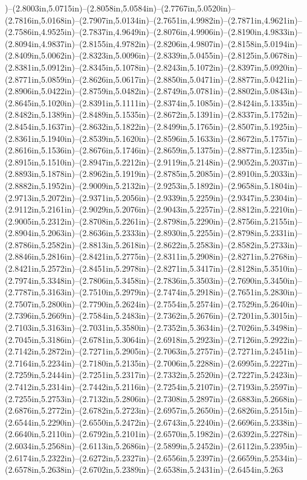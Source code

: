 )--(2.8003in,5.0715in)--(2.8058in,5.0584in)--(2.7767in,5.0520in)--(2.7816in,5.0168in)--(2.7907in,5.0134in)--(2.7651in,4.9982in)--(2.7871in,4.9621in)--(2.7586in,4.9525in)--(2.7837in,4.9649in)--(2.8076in,4.9906in)--(2.8190in,4.9833in)--(2.8094in,4.9837in)--(2.8155in,4.9782in)--(2.8206in,4.9807in)--(2.8158in,5.0194in)--(2.8409in,5.0062in)--(2.8323in,5.0096in)--(2.8339in,5.0455in)--(2.8125in,5.0678in)--(2.8381in,5.0912in)--(2.8345in,5.1078in)--(2.8243in,5.1072in)--(2.8397in,5.0920in)--(2.8771in,5.0859in)--(2.8626in,5.0617in)--(2.8850in,5.0471in)--(2.8877in,5.0421in)--(2.8906in,5.0422in)--(2.8759in,5.0482in)--(2.8749in,5.0781in)--(2.8802in,5.0843in)--(2.8645in,5.1020in)--(2.8391in,5.1111in)--(2.8374in,5.1085in)--(2.8424in,5.1335in)--(2.8482in,5.1389in)--(2.8489in,5.1535in)--(2.8672in,5.1391in)--(2.8337in,5.1752in)--(2.8454in,5.1637in)--(2.8632in,5.1822in)--(2.8499in,5.1765in)--(2.8507in,5.1925in)--(2.8361in,5.1940in)--(2.8539in,5.1620in)--(2.8596in,5.1633in)--(2.8672in,5.1757in)--(2.8616in,5.1536in)--(2.8676in,5.1746in)--(2.8659in,5.1375in)--(2.8877in,5.1235in)--(2.8915in,5.1510in)--(2.8947in,5.2212in)--(2.9119in,5.2148in)--(2.9052in,5.2037in)--(2.8893in,5.1878in)--(2.8962in,5.1919in)--(2.8785in,5.2085in)--(2.8910in,5.2033in)--(2.8882in,5.1952in)--(2.9009in,5.2132in)--(2.9253in,5.1892in)--(2.9658in,5.1804in)--(2.9713in,5.2072in)--(2.9371in,5.2056in)--(2.9339in,5.2259in)--(2.9347in,5.2304in)--(2.9112in,5.2161in)--(2.9029in,5.2076in)--(2.9043in,5.2257in)--(2.8812in,5.2210in)--(2.9005in,5.2312in)--(2.8708in,5.2261in)--(2.8798in,5.2290in)--(2.8756in,5.2155in)--(2.8904in,5.2063in)--(2.8636in,5.2333in)--(2.8930in,5.2255in)--(2.8798in,5.2331in)--(2.8786in,5.2582in)--(2.8813in,5.2618in)--(2.8622in,5.2583in)--(2.8582in,5.2733in)--(2.8846in,5.2816in)--(2.8421in,5.2775in)--(2.8311in,5.2908in)--(2.8271in,5.2768in)--(2.8421in,5.2572in)--(2.8451in,5.2978in)--(2.8271in,5.3417in)--(2.8128in,5.3510in)--(2.7974in,5.3348in)--(2.7806in,5.3458in)--(2.7836in,5.3503in)--(2.7690in,5.3450in)--(2.7787in,5.3163in)--(2.7510in,5.2979in)--(2.7474in,5.2918in)--(2.7651in,5.2830in)--(2.7507in,5.2800in)--(2.7790in,5.2624in)--(2.7554in,5.2574in)--(2.7529in,5.2640in)--(2.7396in,5.2669in)--(2.7584in,5.2483in)--(2.7362in,5.2676in)--(2.7201in,5.3015in)--(2.7103in,5.3163in)--(2.7031in,5.3580in)--(2.7352in,5.3634in)--(2.7026in,5.3498in)--(2.7045in,5.3186in)--(2.6781in,5.3064in)--(2.6918in,5.2923in)--(2.7126in,5.2922in)--(2.7142in,5.2872in)--(2.7271in,5.2905in)--(2.7063in,5.2757in)--(2.7271in,5.2451in)--(2.7164in,5.2234in)--(2.7180in,5.2135in)--(2.7006in,5.2288in)--(2.6995in,5.2227in)--(2.7259in,5.2444in)--(2.7251in,5.2317in)--(2.7332in,5.2520in)--(2.7227in,5.2423in)--(2.7412in,5.2314in)--(2.7442in,5.2116in)--(2.7254in,5.2107in)--(2.7193in,5.2597in)--(2.7255in,5.2753in)--(2.7132in,5.2806in)--(2.7308in,5.2897in)--(2.6883in,5.2668in)--(2.6876in,5.2772in)--(2.6782in,5.2723in)--(2.6957in,5.2650in)--(2.6826in,5.2515in)--(2.6544in,5.2290in)--(2.6550in,5.2472in)--(2.6743in,5.2240in)--(2.6696in,5.2338in)--(2.6640in,5.2110in)--(2.6792in,5.2101in)--(2.6570in,5.1982in)--(2.6392in,5.2278in)--(2.6034in,5.2568in)--(2.6113in,5.2686in)--(2.5899in,5.2452in)--(2.6112in,5.2395in)--(2.6174in,5.2322in)--(2.6272in,5.2327in)--(2.6556in,5.2397in)--(2.6659in,5.2534in)--(2.6578in,5.2638in)--(2.6702in,5.2389in)--(2.6538in,5.2431in)--(2.6454in,5.263